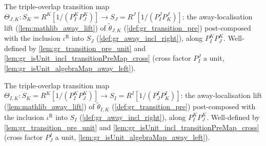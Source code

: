 \begin{definition}\leanok
  \label{def:gr_cocycle_theta_jk}
  The triple-overlap transition map
  \(\Theta_{J,K} : S_K = R^K[1/(P^K_I P^K_J)] \to S_J = R^J[1/(P^J_I P^J_K)]\):
  the away-localisation lift (\cref{lem:mathlib_away_lift}) of
  \(\tilde\theta_{J,K}\) (\cref{def:gr_transition_pre}) post-composed with the
  inclusion \(\iota^{\mathrm{R}}\) into \(S_J\) (\cref{def:gr_away_incl_right}),
  along \(P^K_I P^K_J\). Well-defined by \cref{lem:gr_transition_pre_unit} and
  \cref{lem:gr_isUnit_incl_transitionPreMap_cross} (cross factor \(P^J_I\) a
  unit, \cref{lem:gr_isUnit_algebraMap_away_left}).
\end{definition}

\begin{definition}\leanok
  \label{def:gr_cocycle_theta_ik}
  The triple-overlap transition map
  \(\Theta_{I,K} : S_K = R^K[1/(P^K_I P^K_J)] \to S_I = R^I[1/(P^I_J P^I_K)]\):
  the away-localisation lift (\cref{lem:mathlib_away_lift}) of
  \(\tilde\theta_{I,K}\) (\cref{def:gr_transition_pre}) post-composed with the
  inclusion \(\iota^{\mathrm{R}}\) into \(S_I\) (\cref{def:gr_away_incl_right}),
  along \(P^K_I P^K_J\). Well-defined by \cref{lem:gr_transition_pre_unit} and
  \cref{lem:gr_isUnit_incl_transitionPreMap_cross} (cross factor \(P^I_J\) a
  unit, \cref{lem:gr_isUnit_algebraMap_away_left}).
\end{definition}


